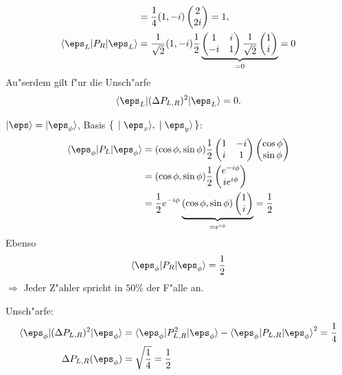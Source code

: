 \documentclass[a4paper]{scrartcl}
\begin{document}
{\begin{1aufz}
\begin{align*}
& = \frac14 (1, -i) \begin{pmatrix} 2 \\ 2i \end{pmatrix} = 1, \\
\braket{ \eps_L | P_R | \eps_L } & = \frac1{\sqrt2} (1, -i) \frac12 \underbrace{\begin{pmatrix} 1 & i \\ -i & 1 \end{pmatrix} \frac1{\sqrt2} \begin{pmatrix} 1 \\ i \end{pmatrix}}_{=0} = 0 
\end{align*}
Au"serdem gilt f"ur die Unsch"arfe
$$\braket{ \eps_L | (\Delta P_{L,R})^2 | \eps_L } = 0. $$
\item $\ket \eps = \ket { \eps_\phi}$, Basis $\set{ \ket{\eps_x}, \ket{\eps_y}}$:
\begin{align}
\begin{split}
\braket{ \eps_\phi | P_L | \eps_\phi } & = (\cos \phi, \sin \phi) \frac12 \begin{pmatrix} 1 & -i \\ i & 1 \end{pmatrix} \begin{pmatrix} \cos \phi \\ \sin \phi \end{pmatrix} \\
& = (\cos \phi, \sin \phi) \frac 12 \begin{pmatrix} e^{-i\phi} \\ i e^{i\phi} \end{pmatrix} \\
& = \frac 12 e^{-i \phi} \underbrace{ (\cos \phi , \sin \phi) \begin{pmatrix} 1 \\ i \end{pmatrix}}_{= e^{i\phi}} = \frac12
\end{split}
\end{align}
Ebenso 
\begin{align}
\braket { \eps_\phi | P_R | \eps_\phi } = \frac12
\end{align}
$\Longrightarrow$ Jeder Z"ahler spricht in $50 \%$ der F"alle an.

Unsch"arfe:
\begin{align}
\begin{split}
\braket{ \eps_\phi | (\Delta P_{L,R})^2 | \eps_\phi } & = \braket {\eps_\phi | P_{L,R}^2 | \eps_\phi} - \braket{ \eps_\phi | P_{L,R} | \eps_\phi }^2 = \frac14 \\
\Delta P_{L,R}(\eps_\phi) & = \sqrt { \frac 14} = \frac12
\end{split}
\end{align}
\end{1aufz}

}
\end{document}
